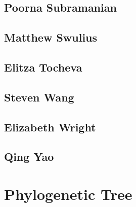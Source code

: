 \documentclass[]{tufte-book}
\begin{document}
\hypertarget{poorna_subramanian}{%
\section*{Poorna Subramanian}\label{poorna_subramanian}}

\hypertarget{matthew_swulius}{%
\section*{Matthew Swulius}\label{matthew_swulius}}

\hypertarget{elitza_tocheva}{%
\section*{Elitza Tocheva}\label{elitza_tocheva}}

\hypertarget{steven_wang}{%
\section*{Steven Wang}\label{steven_wang}}

\hypertarget{elizabeth_wright}{%
\section*{Elizabeth Wright}\label{elizabeth_wright}}

\hypertarget{qing_yao}{%
\section*{Qing Yao}\label{qing_yao}}

\hypertarget{tree}{%
\chapter{Phylogenetic Tree}\label{tree}}
\end{document}
